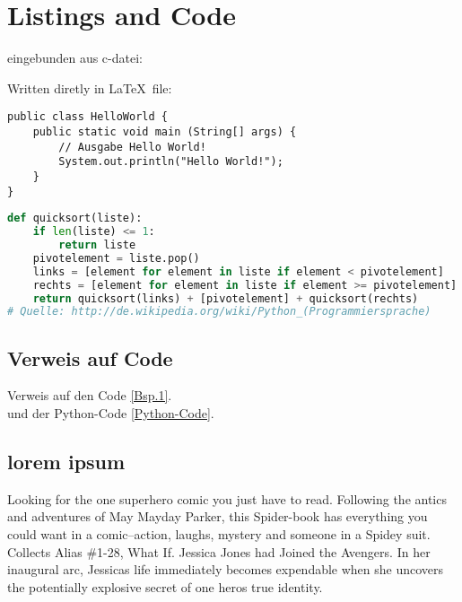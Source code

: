 
\chapter{Listings and Code}

eingebunden aus c-datei:
\label{blinky_source}

Written diretly in \LaTeX \ file:
\begin{lstlisting}[caption=Code-Beispiel, label=Bsp.1]
public class HelloWorld {
	public static void main (String[] args) {
		// Ausgabe Hello World!
		System.out.println("Hello World!");
	}
}
\end{lstlisting}

\begin{lstlisting}[caption=Python-Code, label=Python-Code, title=Titel des Python-Codes,language=Python]
def quicksort(liste):
	if len(liste) <= 1:
		return liste
	pivotelement = liste.pop()
	links = [element for element in liste if element < pivotelement]
	rechts = [element for element in liste if element >= pivotelement]
	return quicksort(links) + [pivotelement] + quicksort(rechts)
# Quelle: http://de.wikipedia.org/wiki/Python_(Programmiersprache)
\end{lstlisting}

\section{Verweis auf Code}
Verweis auf den Code \autoref{Bsp.1}.\\
und der Python-Code \autoref{Python-Code}.

\section{lorem ipsum}
Looking for the one superhero comic you just have to read. Following the antics and adventures of May Mayday Parker, this Spider-book has everything you could want in a comic--action, laughs, mystery and someone in a Spidey suit. Collects Alias \#1-28, What If. Jessica Jones had Joined the Avengers. In her inaugural arc, Jessicas life immediately becomes expendable when she uncovers the potentially explosive secret of one heros true identity.

